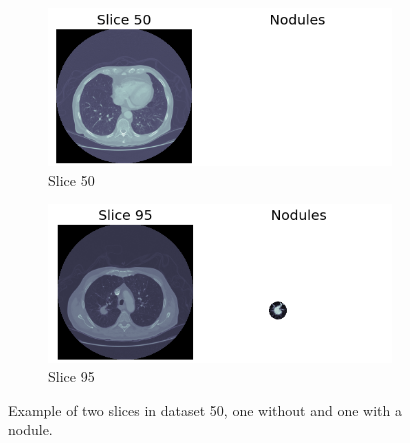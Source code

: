 \begin{figure}[ht]
\begin{center}
	\begin{subfigure}[b]{\linewidth}
		\includegraphics[width=\linewidth]{img/cascades/D50S50.png}
		\caption{Slice 50}
	\end{subfigure}
	\begin{subfigure}[b]{\linewidth}
		\includegraphics[width=\linewidth]{img/cascades/D50S95.png}
  		\caption{Slice 95}
	\end{subfigure}
	\caption{Example of two slices in dataset 50, one without and one with a
	nodule.}
	\label{fig:d50}
\end{center}
\end{figure}

